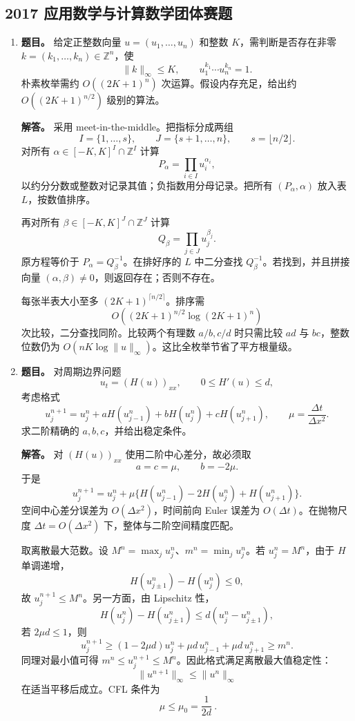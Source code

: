 ﻿\documentclass[UTF8,12pt]{ctexart}
\begin{document}
\subsection{2017 应用数学与计算数学团体赛题}
\begin{enumerate}[label=\textbf{\arabic*.},leftmargin=2.2em]
\item \textbf{题目。} 给定正整数向量 \(u=(u_1,\ldots,u_n)\) 和整数 \(K\)，需判断是否存在非零 \(k=(k_1,\ldots,k_n)\in\mathbb Z^n\)，使
\[
\|k\|_\infty\le K,\qquad u_1^{k_1}\cdots u_n^{k_n}=1.
\]
朴素枚举需约 \(O((2K+1)^n)\) 次运算。假设内存充足，给出约 \(O((2K+1)^{n/2})\) 级别的算法。

\textbf{解答。} 采用 meet-in-the-middle。把指标分成两组
\[
I=\{1,\ldots,s\},\qquad J=\{s+1,\ldots,n\},\qquad s=\lfloor n/2\rfloor .
\]
对所有 \(\alpha\in[-K,K]^I\cap\mathbb Z^I\) 计算
\[
P_\alpha=\prod_{i\in I}u_i^{\alpha_i},
\]
以约分分数或整数对记录其值；负指数用分母记录。把所有 \((P_\alpha,\alpha)\) 放入表 \(L\)，按数值排序。

再对所有 \(\beta\in[-K,K]^J\cap\mathbb Z^J\) 计算
\[
Q_\beta=\prod_{j\in J}u_j^{\beta_j}.
\]
原方程等价于 \(P_\alpha=Q_\beta^{-1}\)。在排好序的 \(L\) 中二分查找 \(Q_\beta^{-1}\)。若找到，并且拼接向量 \((\alpha,\beta)\ne0\)，则返回存在；否则不存在。

每张半表大小至多 \((2K+1)^{\lceil n/2\rceil}\)。排序需
\[
O\!\left((2K+1)^{n/2}\log(2K+1)^n\right)
\]
次比较，二分查找同阶。比较两个有理数 \(a/b,c/d\) 时只需比较 \(ad\) 与 \(bc\)，整数位数仍为 \(O(nK\log\|u\|_\infty)\)。这比全枚举节省了平方根量级。

\item \textbf{题目。} 对周期边界问题
\[
u_t=(H(u))_{xx},\qquad 0\le H'(u)\le d,
\]
考虑格式
\[
u_j^{n+1}=u_j^n+aH(u_{j-1}^n)+bH(u_j^n)+cH(u_{j+1}^n),
\qquad \mu=\frac{\Delta t}{\Delta x^2}.
\]
求二阶精确的 \(a,b,c\)，并给出稳定条件。

\textbf{解答。} 对 \((H(u))_{xx}\) 使用二阶中心差分，故必须取
\[
a=c=\mu,\qquad b=-2\mu.
\]
于是
\[
u_j^{n+1}=u_j^n+\mu\{H(u_{j-1}^n)-2H(u_j^n)+H(u_{j+1}^n)\}.
\]
空间中心差分误差为 \(O(\Delta x^2)\)，时间前向 Euler 误差为 \(O(\Delta t)\)。在抛物尺度 \(\Delta t=O(\Delta x^2)\) 下，整体与二阶空间精度匹配。

取离散最大范数。设 \(M^n=\max_j u_j^n\)、\(m^n=\min_j u_j^n\)。若 \(u_j^n=M^n\)，由于 \(H\) 单调递增，
\[
H(u_{j\pm1}^n)-H(u_j^n)\le0,
\]
故 \(u_j^{n+1}\le M^n\)。另一方面，由 Lipschitz 性，
\[
H(u_j^n)-H(u_{j\pm1}^n)\le d(u_j^n-u_{j\pm1}^n),
\]
若 \(2\mu d\le1\)，则
\[
u_j^{n+1}\ge (1-2\mu d)u_j^n+\mu d\,u_{j-1}^n+\mu d\,u_{j+1}^n\ge m^n.
\]
同理对最小值可得 \(m^n\le u_j^{n+1}\le M^n\)。因此格式满足离散最大值稳定性：
\[
\|u^{n+1}\|_\infty\le \|u^n\|_\infty
\]
在适当平移后成立。CFL 条件为
\[
\boxed{\ \mu\le \mu_0=\frac1{2d}\ }.
\]


\end{enumerate}
\end{document}

